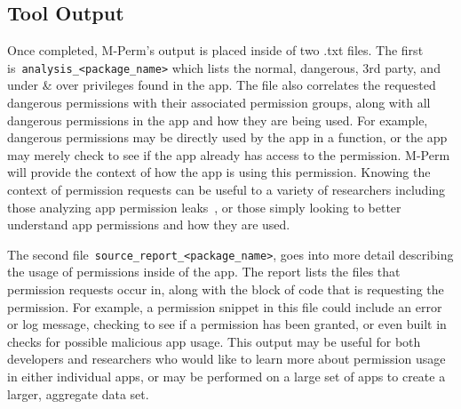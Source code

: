 \documentclass{sig-alternate-05-2015}
\begin{document}




\subsection{Tool Output} %

Once completed, M-Perm's output is placed inside of two .txt files. The first is~\texttt{analysis\_<package\_name>} which lists the normal, dangerous, 3rd party, and under \& over privileges found in the app. The file also correlates the requested dangerous permissions with their associated permission groups, along with all dangerous permissions in the app and how they are being used. For example, dangerous permissions may be directly used by the app in a function, or the app may merely check to see if the app already has access to the permission. M-Perm will provide the context of how the app is using this permission. Knowing the context of permission requests can be useful to a variety of researchers including those analyzing app permission leaks~\cite{wang2015cicc}, or those simply looking to better understand app permissions and how they are used.

The second file~\texttt{source\_report\_<package\_name>}, goes into more detail describing the usage of permissions inside of the app. The report lists the files that permission requests occur in, along with the block of code that is requesting the permission. For example, a permission snippet in this file could include an error or log message, checking to see if a permission has been granted, or even built in checks for possible malicious app usage. This output may be useful for both developers and researchers who would like to learn more about permission usage in either individual apps, or may be performed on a large set of apps to create a larger, aggregate data set. %
\end{document}
